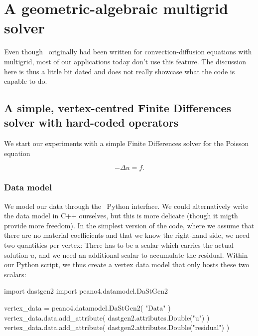 \chapter{A geometric-algebraic multigrid solver}
\label{section:python-api-examples:multigrid}


\begin{remark}
 Even though \Peano\ originally had been written for convection-diffusion equations with multigrid,
 most of our applications today don't use this feature. 
 The discussion here is thus a little bit dated and does not really showcase what the code is capable to do.
\end{remark}


\section{A simple, vertex-centred Finite Differences solver with hard-coded operators}

We start our experiments with a simple Finite Differences solver for the Poisson equation

\[
 - \Delta u = f.
\]



\subsection{Data model}

We model our data through the \DaStGen\ Python interface. 
We could alternatively write the data model in C++ ourselves, but this is more delicate (though it migth provide more freedom).
In the simplest version of the code, where we assume that there are no material coefficients and that we know the right-hand side, we need two quantities per vertex:
There has to be a scalar which carries the actual solution $u$, and we need an additional scalar to accumulate the residual.  
Within our Python script, we thus create a vertex data model that only hosts these two scalars:


\begin{code}
import dastgen2
import peano4.datamodel.DaStGen2

vertex_data = peano4.datamodel.DaStGen2( "Data" )
vertex_data.data.add_attribute( dastgen2.attributes.Double("u") )
vertex_data.data.add_attribute( dastgen2.attributes.Double("residual") )
\end{code}

